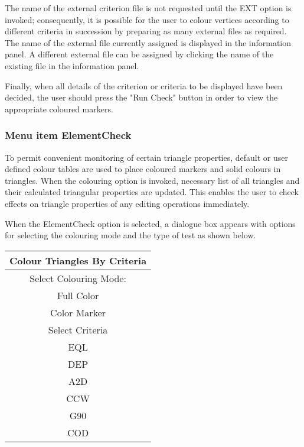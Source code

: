 \documentclass{article}
\begin{document}
The name of the external criterion file is not requested until the EXT option is invoked; consequently, it is possible for the user to colour vertices according to different criteria in succession by preparing as many external files as required. The name of the external file currently assigned is displayed in the information panel. A different external file can be assigned by clicking the name of the existing file in the information panel.

Finally, when all details of the criterion or criteria to be displayed have been decided, the user should press the "Run Check" button in order to view the appropriate coloured markers. %

\subsubsection{Menu item ElementCheck}

To permit convenient monitoring of certain triangle properties, default or user defined colour tables are used to place coloured markers and solid colours in triangles. When the colouring option is invoked, necessary list of all triangles and their calculated triangular properties are updated. This enables the user to check effects on triangle properties of any editing operations immediately.

When the ElementCheck option is selected, a dialogue box appears with options for selecting the colouring mode and the type of test as shown below.

\begin{center}
 \begin{tabular}{| c |}
\hline
Colour Triangles By Criteria\\
\hline
Select Colouring Mode:\\
\hline
\indent	Full Color\\
\indent	Color Marker\\
\hline
Select Criteria\\
\hline
\indent	EQL\\
\indent	DEP\\
\indent	A2D\\
\indent	CCW \\
\indent	G90\\
\indent	COD\\
\hline
 \end{tabular}
\end{center}
\end{document}
